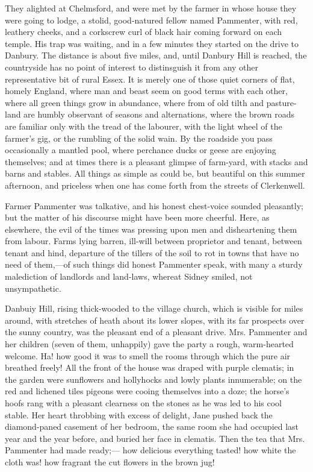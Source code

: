 {}They alighted at Chelmsford, and were met by the farmer in whose house
they were going to lodge, a stolid, good-natured fellow named Pammenter,
with red, leathery cheeks, and a corkscrew curl of black hair coming
forward on each temple. His trap was waiting, and in a few minutes they
started on the drive to Danbury. The distance is about five miles, and,
until Danbury Hill is reached, the countryside has no point of interest
to distinsguish it from any other representative bit of rural Essex. It
is merely one of those quiet corners of flat, homely England, where man
and beast seem on good terms with each other, where all green things
grow in abundance, where from of old tilth and pasture-land are humbly
observant of seasons and alternations, where the brown roads are
familiar only with the tread of the labourer, with the light wheel of
the farmer's gig, or the rumbling of the solid wain. By the roadside you
pass occasionally a mantled pool, where perchance ducks or geese are
enjoying themselves; and at times {}there is a pleasant glimpse of
farm-yard, with stacks and barns and stables. All things as simple as
could be, but beautiful on this summer afternoon, and priceless when one
has come forth from the streets of Clerkenwell.

Farmer Pammenter was talkative, and his honest chest-voice sounded
pleasantly; but the matter of his discourse might have been more
cheerful. Here, as elsewhere, the evil of the times was pressing upon
men and disheartening them from labour. Farms lying barren, ill-will
between proprietor and tenant, between tenant and hind, departure of the
tillers of the soil to rot in towns that have no need of them,---of such
things did honest Pammenter speak, with many a sturdy malediction of
landlords and land-laws, whereat Sidney smiled, not unsympathetic.

Danbuiy Hill, rising thick-wooded to the village church, which is
visible for miles around, with stretches of heath about its lower
slopes, with its far prospects over the sunny country, was the pleasant
end of a pleasant drive. Mrs. Pammenter and her {}children (seven of
them, unhappily) gave the party a rough, warm-hearted welcome. Ha! how
good it was to smell the rooms through which the pure air breathed
freely! All the front of the house was draped with purple clematis; in
the garden were sunflowers and hollyhocks and lowly plants innumerable;
on the red and lichened tiles pigeons were cooing themselves into a
doze; the horse's hoofs rang with a pleasant clearness on the stones as
he was led to his cool stable. Her heart throbbing with excess of
delight, Jane pushed back the diamond-paned casement of her bedroom, the
same room she had occupied last year and the year before, and buried her
face in clematis. Then the tea that Mrs. Pammenter had made ready;---
how delicious everything tasted! how white the cloth was! how fragrant
the cut flowers in the brown jug!

